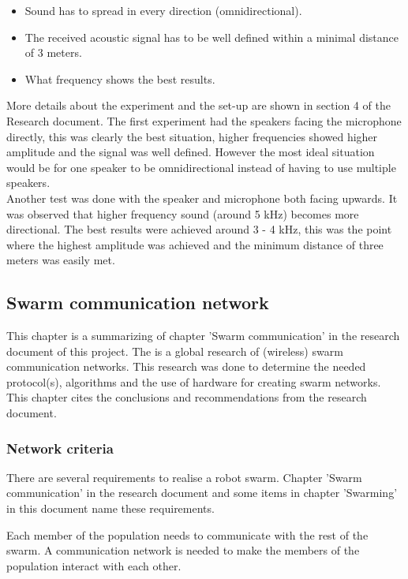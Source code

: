 \documentclass[10pt,a4paper]{article}
\begin{document}
\begin{itemize}
\item Sound has to spread in every direction (omnidirectional).
\item The received acoustic signal has to be well defined within a minimal distance of 3 meters.
\item What frequency shows the best results.
\end{itemize}

More details about the experiment and the set-up are shown in section 4 of the Research document. The first experiment had the speakers facing the microphone directly, this was clearly the best situation, higher frequencies showed higher amplitude and the signal was well defined. However the most ideal situation would be for one speaker to be omnidirectional instead of having to use multiple speakers.  \\
Another test was done with the speaker and microphone both facing upwards. It was observed that higher frequency sound (around 5 kHz) becomes more directional. The best results were achieved around 3 - 4 kHz, this was the point where the highest amplitude was achieved and the minimum distance of three meters was easily met.
\subsection{Swarm communication network}
This chapter is a summarizing of chapter 'Swarm communication' in the research document of this project. The is a global research of (wireless) swarm communication networks. This research was done to determine the needed protocol(s), algorithms and the use of hardware for creating swarm networks. This chapter cites the conclusions and recommendations from the research document.

\subsubsection{Network criteria}
There are several requirements to realise a robot swarm. Chapter 'Swarm communication' in the research document and some items in chapter 'Swarming' in this document name these requirements. 

Each member of the population needs to communicate with the rest of the swarm. A communication network is needed to make the members of the population interact with each other.
\end{document}
